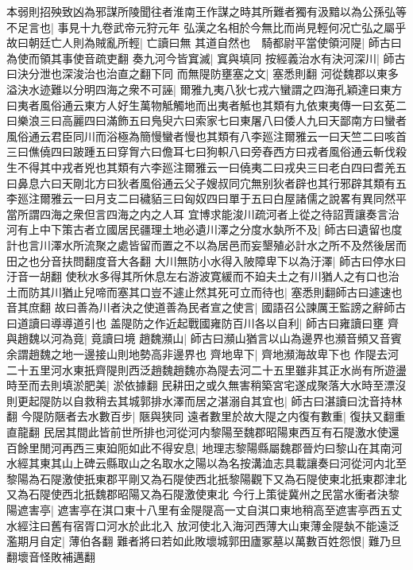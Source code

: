 本弱則招殃致凶為邪謀所陵聞往者淮南王作謀之時其所難者獨有汲黯以為公孫弘等不足言也|{
	事見十九卷武帝元狩元年}
弘漢之名相於今無比而尚見輕何况亡弘之屬乎故曰朝廷亡人則為賊亂所輕|{
	亡讀曰無}
其道自然也　騎都尉平當使領河隄|{
	師古曰為使而領其事使音疏吏翻}
奏九河今皆窴滅|{
	窴與填同}
按經義治水有決河深川|{
	師古曰決分泄也深浚治也治直之翻下同}
而無隄防壅塞之文|{
	塞悉則翻}
河從魏郡以東多溢決水迹難以分明四海之衆不可誣|{
	爾雅九夷八狄七戎六蠻謂之四海孔穎達曰東方曰夷者風俗通云東方人好生萬物觝觸地而出夷者觝也其類有九依東夷傳一曰玄莬二曰樂浪三曰高麗四曰滿飾五曰鳬臾六曰索家七曰東屠八曰倭人九曰天鄙南方曰蠻者風俗通云君臣同川而浴極為簡慢蠻者慢也其類有八李廵注爾雅云一曰天竺二曰咳首三曰僬僥四曰跛踵五曰穿胷六曰儋耳七曰狗軹八曰旁舂西方曰戎者風俗通云斬伐殺生不得其中戎者兇也其類有六李廵注爾雅云一曰僥夷二曰戎央三曰老白四曰耆羌五曰鼻息六曰天剛北方曰狄者風俗通云父子嫂叔同宂無别狄者辟也其行邪辟其類有五李廵注爾雅云一曰月支二曰穢貊三曰匈奴四曰單于五曰白屋諸儒之說畧有異同然平當所謂四海之衆但言四海之内之人耳}
宜博求能浚川疏河者上從之待詔賈讓奏言治河有上中下策古者立國居民疆理土地必遺川澤之分度水埶所不及|{
	師古曰遺留也度計也言川澤水所流聚之處皆留而置之不以為居邑而妄墾殖必計水之所不及然後居而田之也分音扶問翻度音大各翻}
大川無防小水得入陂障卑下以為汙澤|{
	師古曰停水曰汙音一胡翻}
使秋水多得其所休息左右游波寛緩而不廹夫土之有川猶人之有口也治土而防其川猶止兒啼而塞其口豈不遽止然其死可立而待也|{
	塞悉則翻師古曰遽速也音其庶翻}
故曰善為川者決之使道善為民者宣之使言|{
	國語召公諫厲王監謗之辭師古曰道讀曰導導道引也}
盖隄防之作近起戰國雍防百川各以自利|{
	師古曰雍讀曰壅}
齊與趙魏以河為竟|{
	竟讀曰境}
趙魏瀕山|{
	師古曰瀕山猶言以山為邊界也瀕音頻又音賓余謂趙魏之地一邊接山則地勢高非邊界也}
齊地卑下|{
	齊地瀕海故卑下也}
作隄去河二十五里河水東扺齊隄則西泛趙魏趙魏亦為隄去河二十五里雖非其正水尚有所遊盪時至而去則填淤肥美|{
	淤依據翻}
民耕田之或久無害稍築宮宅遂成聚落大水時至漂沒則更起隄防以自救稍去其城郭排水澤而居之湛溺自其宜也|{
	師古曰湛讀曰沈音持林翻}
今隄防陿者去水數百步|{
	陿與狭同}
遠者數里於故大隄之内復有數重|{
	復扶又翻重直龍翻}
民居其間此皆前世所排也河從河内黎陽至魏郡昭陽東西互有石隄激水使還百餘里閒河再西三東廹阨如此不得安息|{
	地理志黎陽縣屬魏郡晉灼曰黎山在其南河水經其東其山上碑云縣取山之名取水之陽以為名按溝洫志具載讓奏曰河從河内北至黎陽為石隄激使扺東郡平剛又為石隄使西北扺黎陽觀下又為石隄使東北扺東郡津北又為石隄使西北扺魏郡昭陽又為石隄激使東北}
今行上策徙冀州之民當水衝者決黎陽遮害亭|{
	遮害亭在淇口東十八里有金隄隄高一丈自淇口東地稍高至遮害亭西五丈水經注曰舊有宿胥口河水於此北入}
放河使北入海河西薄大山東薄金隄埶不能遠泛濫期月自定|{
	薄伯各翻}
難者將曰若如此敗壞城郭田廬冢墓以萬數百姓怨恨|{
	難乃旦翻壞音怪敗補邁翻}
